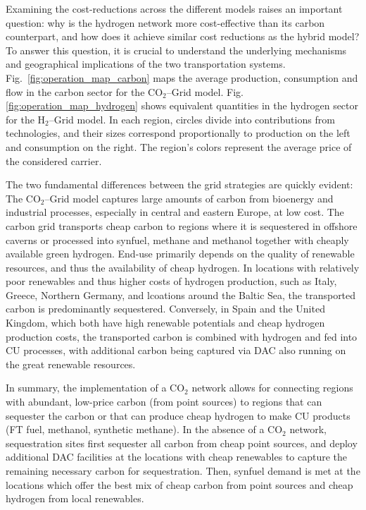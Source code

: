 \documentclass[twocolumn]{article}
\newcommand{\carbon}{CO$_2$}
\newcommand{\hydrogen}{H$_2$}
\newcommand{\hydrogengrid}{\hydrogen{}--Grid}
\newcommand{\carbongrid}{\carbon{}--Grid}
\begin{document}
Examining the cost-reductions across the different models raises an important question: why is the hydrogen network more cost-effective than its carbon counterpart, and how does it achieve similar cost reductions as the hybrid model? To answer this question, it is crucial to understand the underlying mechanisms and geographical implications of the two transportation systems. Fig.~\ref{fig:operation_map_carbon} maps the average production, consumption and flow in the carbon sector for the \carbongrid{} model. Fig. \ref{fig:operation_map_hydrogen} shows equivalent quantities in the hydrogen sector for the \hydrogengrid{} model. In each region, circles divide into contributions from technologies, and their sizes correspond proportionally to production on the left and consumption on the right. The region's colors represent the average price of the considered carrier.

The two fundamental differences between the grid strategies are quickly evident: The \carbongrid{} model captures large amounts of carbon from bioenergy and industrial processes, especially in central and eastern Europe, at low cost. The carbon grid transports cheap carbon to regions where it is sequestered in offshore caverns or processed into synfuel, methane and methanol together with cheaply available green hydrogen. End-use primarily depends on the quality of renewable resources, and thus the availability of cheap hydrogen. In locations with relatively poor renewables and thus higher costs of hydrogen production, such as Italy, Greece, Northern Germany, and lcoations around the Baltic Sea, the transported carbon is predominantly sequestered. Conversely, in Spain and the United Kingdom, which both have high renewable potentials and cheap hydrogen production costs, the transported carbon is combined with hydrogen and fed into CU processes, with additional carbon being captured via DAC also running on the great renewable resources.

In summary, the implementation of a \carbon{} network allows for connecting regions with abundant, low-price carbon (from point sources) to regions that can sequester the carbon or that can produce cheap hydrogen to make CU products (FT fuel, methanol, synthetic methane). In the absence of a \carbon{} network, sequestration sites first sequester all carbon from cheap point sources, and deploy additional DAC facilities at the locations with cheap renewables to capture the remaining necessary carbon for sequestration. Then, synfuel demand is met at the locations which offer the best mix of cheap carbon from point sources and cheap hydrogen from local renewables.
\end{document}
